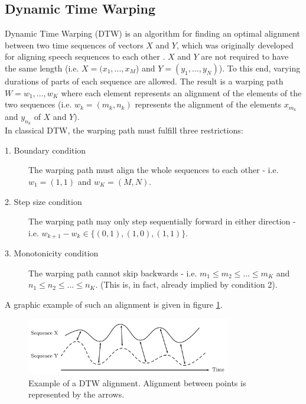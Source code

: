 \subsection{Dynamic Time Warping}
Dynamic Time Warping (DTW) is an algorithm for finding an optimal alignment between two time sequences of vectors $X$ and $Y$, which was originally developed for aligning speech sequences to each other \cite{rabiner}. $X$ and $Y$ are not required to have the same length (i.e. $X = (x_1,...,x_M$) and $Y = (y_1,...,y_N) $). To this end, varying durations of parts of each sequence are allowed. The result is a warping path $W = w_1,...,w_K$ where each element represents an alignment of the elements of the two sequences (i.e. $w_k = (m_k,n_k)$ represents the alignment of the elements $x_{m_k}$ and $y_{n_k}$ of $X$ and $Y$).\\
In classical DTW, the warping path must fulfill three restrictions:
\begin{description}
	\item[1. Boundary condition] The warping path must align the whole sequences to each other - i.e. $w_1 = (1,1)$ and $w_K = (M,N)$.
	\item[2. Step size condition] The warping path may only step sequentially forward in either direction - i.e. $w_{k+1} - w_k \in \{(0,1),(1,0),(1,1)\}$. 
	\item[3. Monotonicity condition] The warping path cannot skip backwards - i.e. $m_1 \leq m_2 \leq ... \leq m_K$ and $n_1 \leq n_2 \leq ... \leq n_K$. (This is, in fact, already implied by condition 2).
\end{description}
A graphic example of such an alignment is given in figure \ref{fig:dtw_example}.\\

\begin{figure}
	\begin{center}
		\includegraphics[width=0.8\textwidth]{images/dtw_example.png}
		\caption{Example of a DTW alignment. Alignment between points is represented by the arrows. \cite{meinard_retrieval}}
		\label{fig:dtw_example}
	\end{center}
\end{figure}

